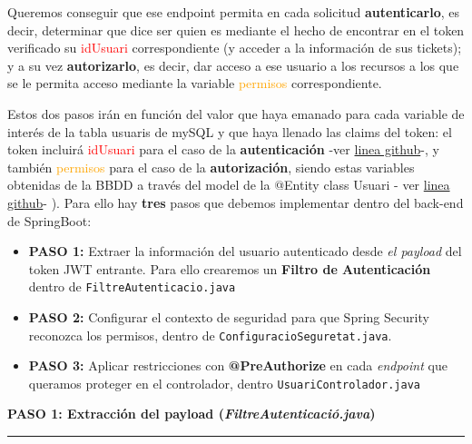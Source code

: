 \documentclass[a4paper,12pt]{report}
\begin{document}
		 Queremos conseguir que ese endpoint permita en cada solicitud \textbf{autenticarlo}, es decir, determinar que dice ser quien es mediante el hecho de encontrar en el token verificado su \textcolor{red}{idUsuari} correspondiente (y acceder a la información de sus tickets); y a su vez \textbf{autorizarlo}, es decir, dar acceso a ese usuario a los recursos a los que se le permita acceso mediante la variable \textcolor{orange}{permisos} correspondiente.
		
		 Estos dos pasos irán en función del valor que haya emanado para cada variable de interés de la tabla usuaris de mySQL y que haya llenado las claims del token: el token incluirá \textcolor{red}{idUsuari} para el caso de la \textbf{autenticación} -ver \href{https://github.com/blackcub3s/mercApp/blob/b01cec515bb9af27a1faa24258abb4313ef275cd/APP%20WEB/__springboot__produccio__/app/src/main/java/miApp/app/Usuaris/model/Usuari.java#L30}{linea github}-, y también  \textcolor{orange}{permisos} para el caso de la \textbf{autorización}, siendo estas variables obtenidas de la BBDD a través del model de la @Entity class Usuari - ver \href{https://github.com/blackcub3s/mercApp/blob/b01cec515bb9af27a1faa24258abb4313ef275cd/APP%20WEB/__springboot__produccio__/app/src/main/java/miApp/app/Usuaris/model/Usuari.java#L42}{linea github}- ). Para ello hay \textbf{tres} pasos que debemos implementar dentro del back-end de SpringBoot:
		
		
		
		
		\begin{itemize} 
			\setlength{\itemsep}{-1.5em}
			\item \textbf{PASO 1:} Extraer la información del usuario autenticado desde \textit{el payload} del token JWT entrante. Para ello crearemos un \textbf{Filtro de Autenticación} dentro de \texttt{FiltreAutenticacio.java}\\
			\item \textbf{PASO 2:} Configurar el contexto de seguridad para que Spring Security reconozca los permisos, dentro de  \texttt{ConfiguracioSeguretat.java}. \\ 	
			\item \textbf{PASO 3:} Aplicar restricciones con \textbf{@PreAuthorize} en cada \textit{endpoint} que queramos proteger en el controlador, dentro \texttt{UsuariControlador.java}
		\end{itemize}
		

		\noindent \textbf{PASO 1: Extracción del payload (\textit{FiltreAutenticació.java})}
		\hrule
		\vspace{1em}
		
\end{document}
